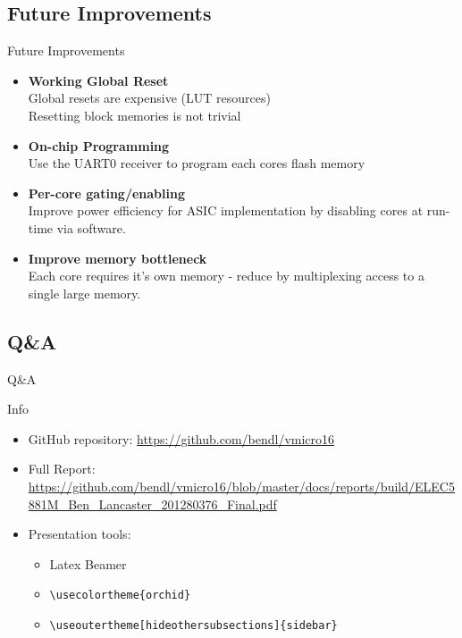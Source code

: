 \documentclass[aspectratio=169]{beamer}
\begin{document}
\subsection{Future Improvements}
\begin{frame}{Future Improvements}

\begin{itemize}
    \item \textbf{Working Global Reset}\\
    Global resets are expensive (LUT resources)\\
    Resetting block memories is not trivial
    
    \item \textbf{On-chip Programming}\\
    Use the UART0 receiver to program each cores flash memory
    
    \item \textbf{Per-core gating/enabling}\\
    Improve power efficiency for ASIC implementation by disabling cores at run-time via software.
    
    \item \textbf{Improve memory bottleneck}\\
    Each core requires it's own memory - reduce by multiplexing access to a single large memory.
\end{itemize}
\end{frame}

\subsection{Q\&A}
\begin{frame}[c]
\begin{center}
\Huge Q\&A
\end{center}

\end{frame}

\begin{frame}[fragile]{Info}
\begin{itemize}\setlength{\itemsep 1em}
    \item GitHub repository: \url{https://github.com/bendl/vmicro16}
    \item Full Report: \url{https://github.com/bendl/vmicro16/blob/master/docs/reports/build/ELEC5881M_Ben_Lancaster_201280376_Final.pdf}
    \item Presentation tools:
    \begin{itemize}\setlength{\itemsep 1em}
        \item Latex Beamer
        \item \verb|\usecolortheme{orchid}|
        \item \verb|\useoutertheme[hideothersubsections]{sidebar}|
    \end{itemize}
\end{itemize}
\end{frame}
\end{document}
